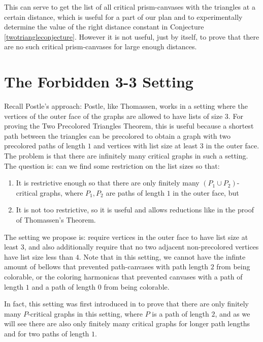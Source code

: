 This can serve to get the list of
all critical prism-canvases with the triangles at a certain distance, which is useful
for a part of our plan and to experimentally determine the value of the right distance constant
in Conjecture \ref{twotriangleconjecture}.
However it is not useful, just by itself, to prove that there are no such critical prism-canvases
for large enough distances. 

\section{The Forbidden 3-3 Setting}

Recall Postle's approach: Postle, like Thomassen, works in a setting where the vertices of the 
outer face of the graphs are allowed to have lists of size $3$. 
For proving the Two Precolored Triangles Theorem, this is useful because a shortest path
between the triangles can be precolored to obtain a graph with two precolored paths
of length $1$ and vertices with list size at least $3$ in the outer face. The problem
is that there are infinitely many critical graphs in such a setting. The question is: can
we find some restriction on the list sizes so that:

\begin{enumerate}
	\item It is restrictive enough so that there are only finitely many $(P_1 \cup P_2)$-critical
	graphs, where $P_1, P_2$ are paths of length $1$ in the outer face, but
	\item It is not too restrictive, so it is useful and allows reductions like in the proof of
	Thomassen's Theorem.
\end{enumerate}

The setting we propose is: require vertices in the outer face to have list size at least $3$, and
also additionally require that no two adjacent non-precolored vertices have list size less than $4$. 
Note that in this setting, we cannot have the infinte amount of bellows that prevented
path-canvases with path length $2$ from being colorable, or the coloring harmonicas that prevented
canvases with a path of length $1$ and a path of length $0$ from being colorable.

In fact, this setting was first introduced in \cite{crossingsfarapart} to prove that there
are only finitely many $P$-critical graphs in this setting,
where $P$ is a path of length $2$, and as we will
see there are also only finitely many critical graphs for longer path lengths and for two 
paths of length $1$.

